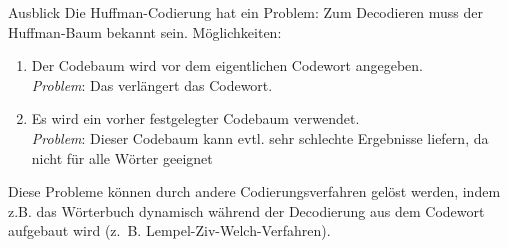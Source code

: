 \begin{frame}{Ausblick}
	Die Huffman-Codierung hat ein Problem: Zum Decodieren muss der Huffman-Baum bekannt sein. Möglichkeiten:
	\begin{enumerate}
		\item Der Codebaum wird vor dem eigentlichen Codewort angegeben.\\ 
		\emph{Problem}: Das verlängert das Codewort.
		\item Es wird ein vorher festgelegter Codebaum verwendet.\\
		 \emph{Problem}: Dieser Codebaum kann evtl. sehr schlechte Ergebnisse liefern, da nicht für alle Wörter geeignet
	\end{enumerate}

	Diese Probleme können durch andere Codierungsverfahren gelöst werden, indem z.B. das Wörterbuch dynamisch während der Decodierung aus dem Codewort aufgebaut wird (z.~B. Lempel-Ziv-Welch-Verfahren).
\end{frame}

